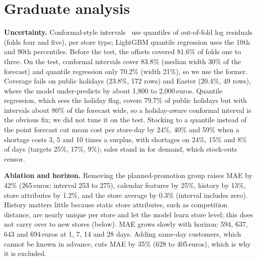 \documentclass[10pt,twocolumn]{extarticle}
\newcommand{\eur}{\,euros}
\begin{document}
\section{Graduate analysis}
\textbf{Uncertainty.} Conformal-style intervals~\cite{conf} use quantiles of out-of-fold log residuals (folds four and five), per store type; LightGBM quantile regression uses the 10th and 90th percentiles. Before the test, the offsets covered 81.6\% of folds one to three. On the test, conformal intervals cover 83.8\% (median width 30\% of the forecast) and quantile regression only 70.2\% (width 21\%), so we use the former. Coverage fails on public holidays (23.8\%, 172 rows) and Easter (20.4\%, 49 rows), where the model under-predicts by about 1,800 to 2,000\eur. Quantile regression, which sees the holiday flag, covers 79.7\% of public holidays but with intervals about 80\% of the forecast wide, so a holiday-aware conformal interval is the obvious fix; we did not tune it on the test. Stocking to a quantile instead of the point forecast cut mean cost per store-day by 24\%, 40\% and 59\% when a shortage costs 3, 5 and 10 times a surplus, with shortages on 24\%, 15\% and 8\% of days (targets 25\%, 17\%, 9\%); sales stand in for demand, which stock-outs censor.



\textbf{Ablation and horizon.} Removing the planned-promotion group raises MAE by 42\% (265\eur; interval 253 to 275), calendar features by 25\%, history by 13\%, store attributes by 1.2\%, and the store average by 0.3\% (interval includes zero). History matters little because static store attributes, such as competition distance, are nearly unique per store and let the model learn store level; this does not carry over to new stores (below). MAE grows slowly with horizon: 594, 637, 643 and 694\eur{} at 1, 7, 14 and 28 days. Adding same-day customers, which cannot be known in advance, cuts MAE by 35\% (628 to 405\eur), which is why it is excluded.
\end{document}
